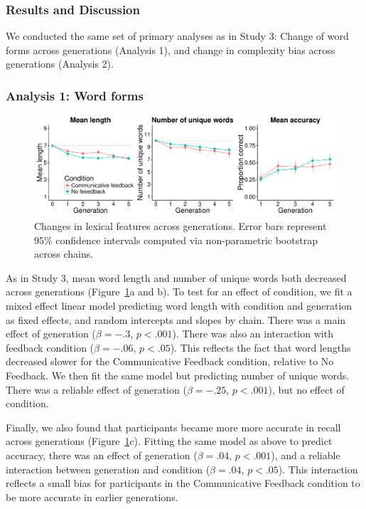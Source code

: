 \subsubsection{Results and Discussion}

We conducted the same set of primary analyses as in Study 3: Change of word forms across generations (Analysis 1), and change in complexity bias across generations (Analysis 2). 

\subsubsection{Analysis 1: Word forms}

\begin{figure}[t!]
\begin{center}
\includegraphics[scale = .5]{figs/chap4_4.pdf}
\end{center}
\caption{Changes in lexical features across generations. Error bars represent 95\% confidence intervals computed via non-parametric bootstrap across chains. }
\label{fig:length_4}
\end{figure}

As in Study 3,  mean word length and number of unique words both decreased across generations (Figure\ \ref{fig:length_4}a and b). To test for an effect of condition, we fit a mixed effect linear model predicting word length with  condition and generation as fixed effects, and random intercepts and slopes by chain. There was a main effect of generation ($\beta=-.3$, $p <.001$). There was also an interaction with feedback condition ($\beta=-.06$, $p <.05$). This reflects the fact that word lengths decreased slower for the Communicative Feedback condition, relative to No Feedback. We then fit the same model but predicting number of unique words. There was a reliable effect of generation ($\beta=-.25$, $p <.001$), but no effect of condition.

Finally, we also found that participants became more more accurate in recall across generations (Figure\ \ref{fig:length_4}c). Fitting the same model as above to predict accuracy, there was an effect of generation ($\beta=.04$, $p <.001$), and a reliable interaction between generation and condition  ($\beta=.04$, $p <.05$). This interaction reflects a small bias for participants in the Communicative Feedback condition to be more accurate in earlier generations. 

